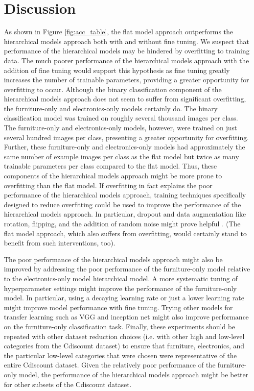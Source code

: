 \section{Discussion}

As shown in Figure \ref{fig:acc_table}, the flat model approach outperforms the hierarchical models approach both with and without fine tuning.
We suspect that performance of the hierarchical models may be hindered by overfitting to training data.
The much poorer performance of the hierarchical models approach with the addition of fine tuning would support this hypothesis as fine tuning greatly increases the number of trainable parameters, providing a greater opportunity for overfitting to occur.
Although the binary classification component of the hierarchical models approach does not seem to suffer from significant overfitting, the furniture-only and electronics-only models certainly do.
The binary classification model was trained on roughly several thousand images per class.
The furniture-only and electronics-only models, however, were trained on just several hundred images per class, presenting a greater opportunity for overfitting.
Further, these furniture-only and electronics-only models had approximately the same number of example images per class as the flat model but twice as many trainable parameters per class compared to the flat model.
Thus, these components of the hierarchical models approach might be more prone to overfitting than the flat model. 
If overfitting in fact explains the poor performance of the hierarchical models approach, training techniques specifically designed to reduce overfitting could be used to improve the performance of the hierarchical models approach.
In particular, dropout and data augmentation like rotation, flipping, and the addition of random noise might prove helpful \cite{srivastava2014dropout, taylor2017improving}.
(The flat model approach, which also suffers from overfitting, would certainly stand to benefit from such interventions, too).

The poor performance of the hierarchical models approach might also be improved by addressing the poor performance of the furniture-only model relative to the electronics-only model hierarchical model.
A more systematic tuning of hyperparameter settings might improve the performance of the furniture-only model.
In particular, using a decaying learning rate or just a lower learning rate might improve model performance with fine tuning.
Trying other models for transfer learning such as VGG \cite{he2016deep} and inception net \cite{szegedy2015going} might also improve performance on the furniture-only classification task.   
Finally, these experiments should be repeated with other dataset reduction choices (i.e. with other high and low-level categories from the Cdiscount dataset) to ensure that furniture, electronics, and the particular low-level categories that were chosen were representative of the entire Cdiscount dataset.
Given the relatively poor performance of the furniture-only model, the performance of the hierarchical models approach might be better for other subsets of the Cdiscount dataset.  

